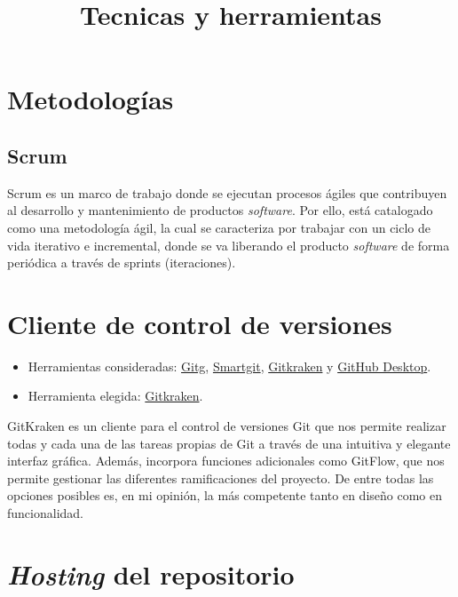 \documentclass[
]{article}
\title{Tecnicas y herramientas}
\author{}
\date{}
\providecommand{\tightlist}{%
  \setlength{\itemsep}{0pt}\setlength{\parskip}{0pt}}
\begin{document}
\maketitle

\hypertarget{metodologuxedas}{%
\section{Metodologías}\label{metodologuxedas}}

\hypertarget{scrum}{%
\subsection{Scrum}\label{scrum}}

Scrum es un marco de trabajo donde se ejecutan procesos ágiles que
contribuyen al desarrollo y mantenimiento de productos \emph{software}.
Por ello, está catalogado como una metodología ágil, la cual se
caracteriza por trabajar con un ciclo de vida iterativo e incremental,
donde se va liberando el producto \emph{software} de forma periódica a
través de {sprints} (iteraciones).

\hypertarget{cliente-de-control-de-versiones}{%
\section{Cliente de control de
versiones}\label{cliente-de-control-de-versiones}}

\begin{itemize}
\tightlist
\item
  Herramientas consideradas:
  \href{https://wiki.gnome.org/Apps/Gitg/}{Gitg},
  \href{https://www.syntevo.com/smartgit/}{Smartgit},
  \href{https://www.gitkraken.com/}{Gitkraken} y
  \href{https://desktop.github.com/}{GitHub Desktop}.
\item
  Herramienta elegida: \href{https://www.gitkraken.com/}{Gitkraken}.
\end{itemize}

GitKraken es un cliente para el control de versiones {Git} que nos
permite realizar todas y cada una de las tareas propias de {Git} a
través de una intuitiva y elegante interfaz gráfica. Además, incorpora
funciones adicionales como {GitFlow}, que nos permite gestionar las
diferentes ramificaciones del proyecto. De entre todas las opciones
posibles es, en mi opinión, la más competente tanto en diseño como en
funcionalidad.

\hypertarget{hosting-del-repositorio}{%
\section{\texorpdfstring{\emph{Hosting} del
repositorio}{Hosting del repositorio}}\label{hosting-del-repositorio}}
\end{document}
